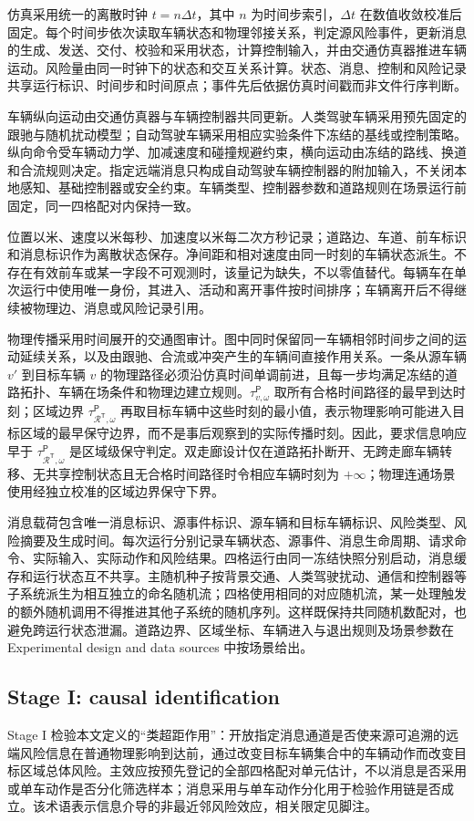 \documentclass[10pt,a4paper,twocolumn]{article}
\begin{document}
仿真采用统一的离散时钟 $t=n\Delta t$，其中 $n$ 为时间步索引，$\Delta t$ 在数值收敛校准后固定。每个时间步依次读取车辆状态和物理邻接关系，判定源风险事件，更新消息的生成、发送、交付、校验和采用状态，计算控制输入，并由交通仿真器推进车辆运动。风险量由同一时钟下的状态和交互关系计算。状态、消息、控制和风险记录共享运行标识、时间步和时间原点；事件先后依据仿真时间戳而非文件行序判断。

车辆纵向运动由交通仿真器与车辆控制器共同更新。人类驾驶车辆采用预先固定的跟驰与随机扰动模型；自动驾驶车辆采用相应实验条件下冻结的基线或控制策略。纵向命令受车辆动力学、加减速度和碰撞规避约束，横向运动由冻结的路线、换道和合流规则决定。指定远端消息只构成自动驾驶车辆控制器的附加输入，不关闭本地感知、基础控制器或安全约束。车辆类型、控制器参数和道路规则在场景运行前固定，同一四格配对内保持一致。

位置以米、速度以米每秒、加速度以米每二次方秒记录；道路边、车道、前车标识和消息标识作为离散状态保存。净间距和相对速度由同一时刻的车辆状态派生。不存在有效前车或某一字段不可观测时，该量记为缺失，不以零值替代。每辆车在单次运行中使用唯一身份，其进入、活动和离开事件按时间排序；车辆离开后不得继续被物理边、消息或风险记录引用。

物理传播采用时间展开的交通图审计。图中同时保留同一车辆相邻时间步之间的运动延续关系，以及由跟驰、合流或冲突产生的车辆间直接作用关系。一条从源车辆 $v'$ 到目标车辆 $v$ 的物理路径必须沿仿真时间单调前进，且每一步均满足冻结的道路拓扑、车辆在场条件和物理边建立规则。$\tau_{v,\omega}^{\mathsf P}$ 取所有合格时间路径的最早到达时刻；区域边界 $\tau_{\mathcal R^{\mathsf T},\omega}^{\mathsf P}$ 再取目标车辆中这些时刻的最小值，表示物理影响可能进入目标区域的最早保守边界，而不是事后观察到的实际传播时刻。因此，要求信息响应早于 $\tau_{\mathcal R^{\mathsf T},\omega}^{\mathsf P}$ 是区域级保守判定。双走廊设计仅在道路拓扑断开、无跨走廊车辆转移、无共享控制状态且无合格时间路径时令相应车辆时刻为 $+\infty$；物理连通场景使用经独立校准的区域边界保守下界。

消息载荷包含唯一消息标识、源事件标识、源车辆和目标车辆标识、风险类型、风险摘要及生成时间。每次运行分别记录车辆状态、源事件、消息生命周期、请求命令、实际输入、实际动作和风险结果。四格运行由同一冻结快照分别启动，消息缓存和运行状态互不共享。主随机种子按背景交通、人类驾驶扰动、通信和控制器等子系统派生为相互独立的命名随机流；四格使用相同的对应随机流，某一处理触发的额外随机调用不得推进其他子系统的随机序列。这样既保持共同随机数配对，也避免跨运行状态泄漏。道路边界、区域坐标、车辆进入与退出规则及场景参数在 Experimental design and data sources 中按场景给出。

\subsection*{Stage I: causal identification}
Stage I 检验本文定义的“类超距作用”：开放指定消息通道是否使来源可追溯的远端风险信息在普通物理影响到达前，通过改变目标车辆集合中的车辆动作而改变目标区域总体风险。主效应按预先登记的全部四格配对单元估计，不以消息是否采用或单车动作是否分化筛选样本；消息采用与单车动作分化用于检验作用链是否成立。该术语表示信息介导的非最近邻风险效应，相关限定见脚注。
\end{document}
